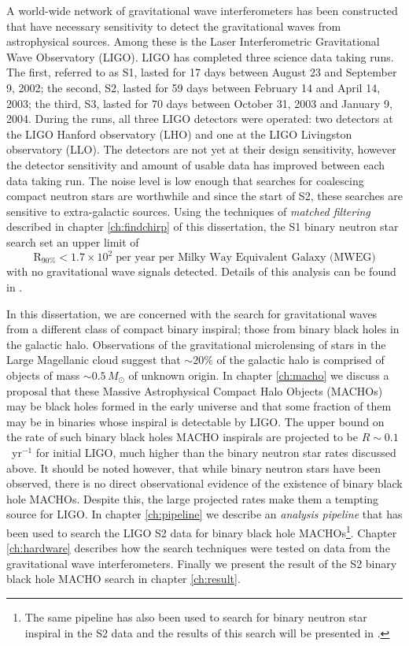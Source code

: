 A world-wide network of gravitational wave interferometers has been
constructed that have necessary sensitivity to detect the gravitational
waves from astrophysical sources. Among these is the Laser Interferometric
Gravitational Wave Observatory (LIGO)\cite{Barish:1999}. LIGO has completed
three science data taking runs. The first, referred to as S1, lasted for 17
days between August 23 and September 9, 2002; the second, S2, lasted for 59
days between February 14 and April 14, 2003; the third, S3, lasted for 70 days
between October 31, 2003 and January 9, 2004.  During the runs, all three LIGO
detectors were operated: two detectors at the LIGO Hanford observatory (LHO)
and one at the LIGO Livingston observatory (LLO).  The detectors are not yet
at their design sensitivity, however the detector sensitivity and amount of
usable data has improved between each data taking run. The noise level is low
enough that searches for coalescing compact neutron stars are worthwhile and
since the start of S2, these searches are sensitive to extra-galactic sources.
Using the techniques of \emph{matched filtering} described in chapter
\ref{ch:findchirp} of this dissertation, the S1 binary neutron star search set
an upper limit of
\begin{equation}
\mathrm{R}_{90\%} < 1.7 \times 10^2 \;\textrm{per year per Milky Way Equivalent Galaxy (MWEG)}
\end{equation}
with no gravitational wave signals detected. Details of this analysis can be
found in \cite{LIGOS1iul}. 

In this dissertation, we are concerned with the
search for gravitational waves from a different class of compact binary
inspiral; those from binary black holes in the galactic halo. Observations of
the gravitational microlensing of stars in the Large Magellanic cloud suggest
that $\sim 20\%$ of the galactic halo is comprised of objects of mass $\sim
0.5\,M_\odot$ of unknown origin. In chapter \ref{ch:macho} we discuss a
proposal that these Massive Astrophysical Compact Halo Objects (MACHOs) may be
black holes formed in the early universe and that some fraction of them may be
in binaries whose inspiral is detectable by LIGO\cite{Nakamura:1997sm}.  The
upper bound on the rate of such binary black holes MACHO inspirals are
projected to be $R \sim 0.1$~yr$^{-1}$ for initial LIGO, much higher than the
binary neutron star rates discussed above. It should be noted however, that
while binary neutron stars have been observed, there is no direct
observational evidence of the existence of binary black hole MACHOs. Despite
this, the large projected rates make them a tempting source for LIGO. In
chapter \ref{ch:pipeline} we describe an \emph{analysis pipeline} that has
been used to search the LIGO S2 data for binary black hole MACHOs\footnote{The
same pipeline has also been used to search for binary neutron star inspiral in
the S2 data and the results of this search will be presented in
\cite{LIGOS2iul}.}. Chapter \ref{ch:hardware} describes how the search
techniques were tested on data from the gravitational wave interferometers.
Finally we present the result of the S2 binary black hole MACHO search in
chapter \ref{ch:result}. 
